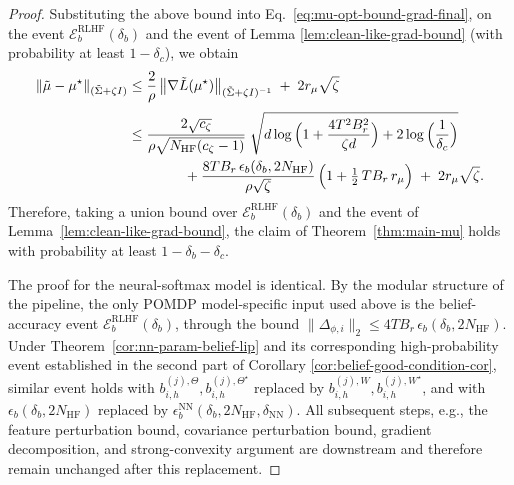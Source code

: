 \documentclass[10pt]{article} %
\theoremstyle{plain}
\theoremstyle{definition}
\theoremstyle{remark}
\begin{document}
\begin{proof}
 Substituting the above bound into Eq.~\ref{eq:mu-opt-bound-grad-final}, on the event
$\mathcal E_{b}^{\mathrm{RLHF}}(\delta_b)$ and the event of Lemma \ref{lem:clean-like-grad-bound}
(with probability at least $1-\delta_c$), we obtain
\begin{align}
\|\tilde\mu-\mu^\star\|_{(\tilde\Sigma+\zeta I)}
&\le \frac{2}{\rho}\,\bigl\|\nabla\tilde L(\mu^\star)\bigr\|_{(\tilde\Sigma+\zeta I)^{-1}}
\;+\;2r_\mu\sqrt{\zeta }\notag\\[3pt]
&\le \frac{2\sqrt{c_\zeta}}{\rho\sqrt{N_{\mathrm{HF}}(c_\zeta-1)}}\;
\sqrt{d\log \Big(1+\frac{4T^2 B_r^2}{\zeta d}\Big)+2\log \Big(\frac{1}{\delta_c}\Big)} \notag\\
&\qquad\qquad + \frac{8T B_r\,\epsilon_b(\delta_b, 2N_{\mathrm{HF}})}{\rho\sqrt{\zeta }}\,
\Bigl(1+\tfrac12\,T B_r\,r_\mu\Bigr)
\;+\;2r_\mu\sqrt{\zeta }.
\label{eq:final-mu-bound}
\end{align}
Therefore, taking a union bound over $\mathcal E_{b}^{\mathrm{RLHF}}(\delta_b)$ and the event of
Lemma~\ref{lem:clean-like-grad-bound}, the claim of Theorem~\ref{thm:main-mu} holds with
probability at least $1-\delta_b-\delta_c$.


\medskip
The proof for the neural-softmax model is identical. By the modular structure of the pipeline, the only POMDP model-specific input used above is the
belief-accuracy event $\mathcal E_b^{\mathrm{RLHF}}(\delta_b)$, through the bound
\(\|\Delta_{\phi,i}\|_2\le 4T B_r\,\epsilon_b(\delta_b,2N_{\mathrm{HF}})\).
Under Theorem~\ref{cor:nn-param-belief-lip} and its corresponding high-probability event established in the second part of Corollary \ref{cor:belief-good-condition-cor}, similar event holds with
\(b_{i,h}^{(j),\Theta},b_{i,h}^{(j),\Theta^\star}\) replaced by
\(b_{i,h}^{(j),W},b_{i,h}^{(j),W^\star}\), and with
\(\epsilon_b(\delta_b,2N_{\mathrm{HF}})\) replaced by
\(\epsilon_b^{\mathrm{NN}}(\delta_b,2N_{\mathrm{HF}},\delta_{\mathrm{NN}})\).
All subsequent steps, e.g., the feature perturbation bound, covariance perturbation bound, gradient decomposition, and strong-convexity argument are downstream and therefore remain unchanged after this replacement.
\end{proof}
\end{document}
